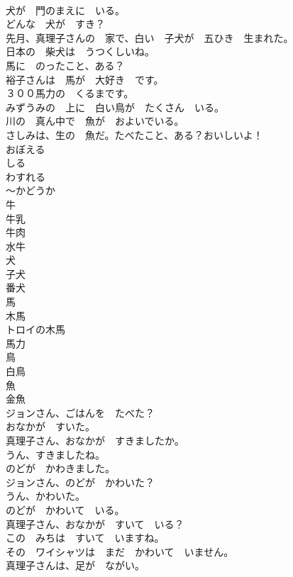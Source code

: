 \documentclass[8pt]{extreport}
\begin{document}
\begin{CJK}{UTF8}{min}
\\	犬が　門のまえに　いる。	
\\	どんな　犬が　すき？	
\\	先月、真理子さんの　家で、白い　子犬が　五ひき　生まれた。	
\\	日本の　柴犬は　うつくしいね。	
\\	馬に　のったこと、ある？	
\\	裕子さんは　馬が　大好き　です。	
\\	３００馬力の　くるまです。	
\\	みずうみの　上に　白い鳥が　たくさん　いる。	
\\	川の　真ん中で　魚が　およいでいる。	
\\	さしみは、生の　魚だ。たべたこと、ある？おいしいよ！	
\\	おぼえる	
\\	しる	
\\	わすれる	
\\	～かどうか	
\\	牛	
\\	牛乳	
\\	牛肉	
\\	水牛	
\\	犬	
\\	子犬	
\\	番犬	
\\	馬	
\\	木馬	
\\	トロイの木馬	
\\	馬力	
\\	鳥	
\\	白鳥	
\\	魚	
\\	金魚	
\\	ジョンさん、ごはんを　たべた？	
\\	おなかが　すいた。	
\\	真理子さん、おなかが　すきましたか。	
\\	うん、すきましたね。	
\\	のどが　かわきました。	
\\	ジョンさん、のどが　かわいた？	
\\	うん、かわいた。	
\\	のどが　かわいて　いる。	
\\	真理子さん、おなかが　すいて　いる？	
\\	この　みちは　すいて　いますね。	
\\	その　ワイシャツは　まだ　かわいて　いません。	
\\	真理子さんは、足が　ながい。	

\end{CJK}
\end{document}
